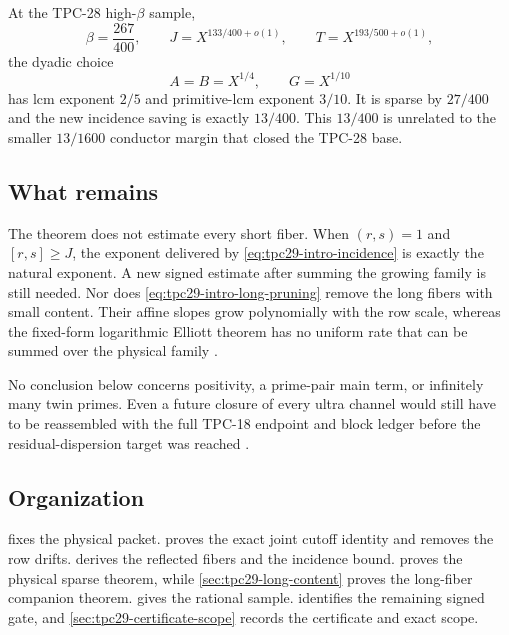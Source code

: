 At the TPC-28 high-$\beta$ sample,
\[
 \beta=\frac{267}{400},\qquad
 J=X^{133/400+o(1)},\qquad
 T=X^{193/500+o(1)},
\]
the dyadic choice
\[
 A=B=X^{1/4},\qquad G=X^{1/10}
\]
has lcm exponent $2/5$ and primitive-lcm exponent $3/10$.  It is
sparse by $27/400$ and the new incidence saving is exactly $13/400$.
This $13/400$ is unrelated to the smaller $13/1600$ conductor margin
that closed the TPC-28 base.

\subsection{What remains}

The theorem does not estimate every short fiber.  When $(r,s)=1$ and
$[r,s]\ge J$, the exponent delivered by
\eqref{eq:tpc29-intro-incidence} is exactly the natural exponent.  A
new signed estimate after summing the growing family is still needed.
Nor does \eqref{eq:tpc29-intro-long-pruning} remove the long fibers
with small content.  Their affine slopes grow polynomially with the
row scale, whereas the fixed-form logarithmic Elliott theorem has no
uniform rate that can be summed over the physical family
\citep{Tao2016}.

No conclusion below concerns positivity, a prime-pair main term, or
infinitely many twin primes.  Even a future closure of every ultra
channel would still have to be reassembled with the full TPC-18
endpoint and block ledger before the residual-dispersion target was
reached \citep{WangTPC18}.

\subsection{Organization}

 fixes the physical packet.
 proves the exact joint cutoff
identity and removes the row drifts.
 derives the reflected fibers and
the incidence bound.   proves the
physical sparse theorem, while \cref{sec:tpc29-long-content} proves
the long-fiber companion theorem.   gives
the rational sample.   identifies
the remaining signed gate, and \cref{sec:tpc29-certificate-scope}
records the certificate and exact scope.
